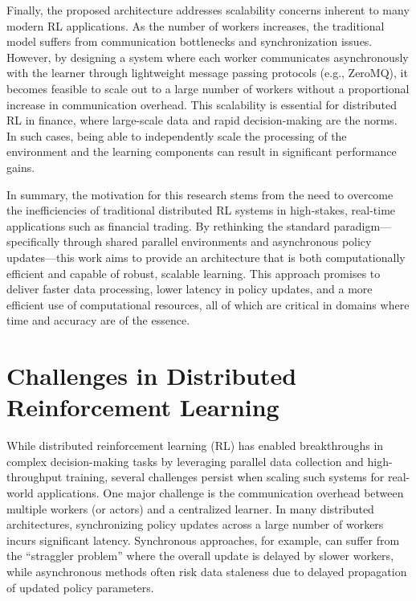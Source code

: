Finally, the proposed architecture addresses scalability concerns inherent to many modern RL applications.
As the number of workers increases, the traditional model suffers from communication bottlenecks and synchronization issues.
However, by designing a system where each worker communicates asynchronously with the learner through lightweight message passing protocols (e.g., ZeroMQ),
it becomes feasible to scale out to a large number of workers without a proportional increase in communication overhead.
This scalability is essential for distributed RL in finance, where large-scale data and rapid decision-making are the norms.
In such cases, being able to independently scale the processing of the environment and the learning components can result in significant performance gains.


In summary, the motivation for this research stems from the need to overcome the inefficiencies of
traditional distributed RL systems in high-stakes, real-time applications such as financial trading.
By rethinking the standard paradigm—specifically through shared parallel environments and asynchronous policy
updates—this work aims to provide an architecture that is both computationally efficient and capable of robust, scalable learning.
This approach promises to deliver faster data processing, lower latency in policy updates, and a more efficient use of computational resources,
all of which are critical in domains where time and accuracy are of the essence.

\section{Challenges in Distributed Reinforcement Learning}
\label{sec:challenges}

While distributed reinforcement learning (RL) has enabled breakthroughs in complex decision-making tasks by
leveraging parallel data collection and high-throughput training,
several challenges persist when scaling such systems for real-world applications.
One major challenge is the communication overhead between multiple workers (or actors) and a centralized learner.
In many distributed architectures, synchronizing policy updates across a large number of workers incurs significant latency.
Synchronous approaches, for example, can suffer from the “straggler problem” where the overall update is delayed by slower workers,
while asynchronous methods often risk data staleness due to delayed propagation of updated policy parameters.


